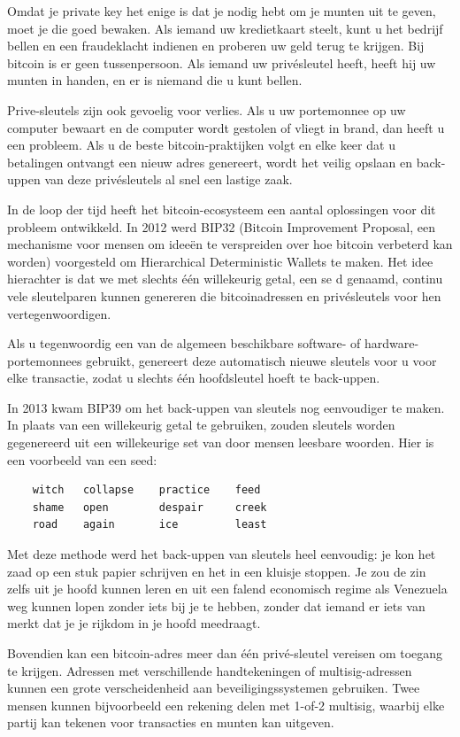 \documentclass[
  letterpaper,
]{scrbook}
\begin{document}
Omdat je private key het enige is dat je nodig hebt om je munten uit te
geven, moet je die goed bewaken. Als iemand uw kredietkaart steelt, kunt
u het bedrijf bellen en een fraudeklacht indienen en proberen uw geld
terug te krijgen. Bij bitcoin is er geen tussenpersoon. Als iemand uw
privésleutel heeft, heeft hij uw munten in handen, en er is niemand die
u kunt bellen.

Prive-sleutels zijn ook gevoelig voor verlies. Als u uw portemonnee op
uw computer bewaart en de computer wordt gestolen of vliegt in brand,
dan heeft u een probleem. Als u de beste bitcoin-praktijken volgt en
elke keer dat u betalingen ontvangt een nieuw adres genereert, wordt het
veilig opslaan en back-uppen van deze privésleutels al snel een lastige
zaak.

In de loop der tijd heeft het bitcoin-ecosysteem een aantal oplossingen
voor dit probleem ontwikkeld. In 2012 werd BIP32 (Bitcoin Improvement
Proposal, een mechanisme voor mensen om ideeën te verspreiden over hoe
bitcoin verbeterd kan worden) voorgesteld om Hierarchical Deterministic
Wallets te maken. Het idee hierachter is dat we met slechts één
willekeurig getal, een se d genaamd, continu vele sleutelparen kunnen
genereren die bitcoinadressen en privésleutels voor hen
vertegenwoordigen.

Als u tegenwoordig een van de algemeen beschikbare software- of
hardware-portemonnees gebruikt, genereert deze automatisch nieuwe
sleutels voor u voor elke transactie, zodat u slechts één hoofdsleutel
hoeft te back-uppen.

In 2013 kwam BIP39 om het back-uppen van sleutels nog eenvoudiger te
maken. In plaats van een willekeurig getal te gebruiken, zouden sleutels
worden gegenereerd uit een willekeurige set van door mensen leesbare
woorden. Hier is een voorbeeld van een seed:

\begin{verbatim}
    witch   collapse    practice    feed
    shame   open        despair     creek
    road    again       ice         least
\end{verbatim}

Met deze methode werd het back-uppen van sleutels heel eenvoudig: je kon
het zaad op een stuk papier schrijven en het in een kluisje stoppen. Je
zou de zin zelfs uit je hoofd kunnen leren en uit een falend economisch
regime als Venezuela weg kunnen lopen zonder iets bij je te hebben,
zonder dat iemand er iets van merkt dat je je rijkdom in je hoofd
meedraagt.

Bovendien kan een bitcoin-adres meer dan één privé-sleutel vereisen om
toegang te krijgen. Adressen met verschillende handtekeningen of
multisig-adressen kunnen een grote verscheidenheid aan
beveiligingssystemen gebruiken. Twee mensen kunnen bijvoorbeeld een
rekening delen met 1-of-2 multisig, waarbij elke partij kan tekenen voor
transacties en munten kan uitgeven.
\end{document}
